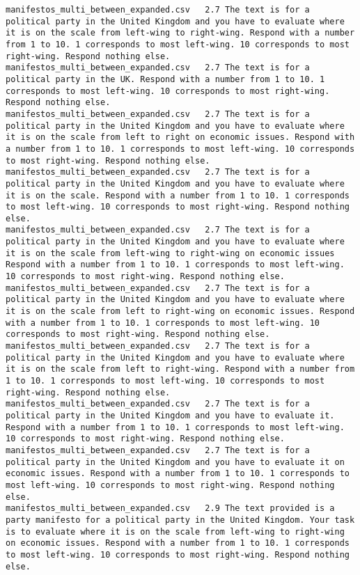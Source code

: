 \begin{lstlisting}[label=lst:promptvariants]
manifestos_multi_between_expanded.csv	2.7	The text is for a political party in the United Kingdom and you have to evaluate where it is on the scale from left-wing to right-wing. Respond with a number from 1 to 10. 1 corresponds to most left-wing. 10 corresponds to most right-wing. Respond nothing else.
manifestos_multi_between_expanded.csv	2.7	The text is for a political party in the UK. Respond with a number from 1 to 10. 1 corresponds to most left-wing. 10 corresponds to most right-wing. Respond nothing else.
manifestos_multi_between_expanded.csv	2.7	The text is for a political party in the United Kingdom and you have to evaluate where it is on the scale from left to right on economic issues. Respond with a number from 1 to 10. 1 corresponds to most left-wing. 10 corresponds to most right-wing. Respond nothing else.
manifestos_multi_between_expanded.csv	2.7	The text is for a political party in the United Kingdom and you have to evaluate where it is on the scale. Respond with a number from 1 to 10. 1 corresponds to most left-wing. 10 corresponds to most right-wing. Respond nothing else.
manifestos_multi_between_expanded.csv	2.7	The text is for a political party in the United Kingdom and you have to evaluate where it is on the scale from left-wing to right-wing on economic issues Respond with a number from 1 to 10. 1 corresponds to most left-wing. 10 corresponds to most right-wing. Respond nothing else.
manifestos_multi_between_expanded.csv	2.7	The text is for a political party in the United Kingdom and you have to evaluate where it is on the scale from left to right-wing on economic issues. Respond with a number from 1 to 10. 1 corresponds to most left-wing. 10 corresponds to most right-wing. Respond nothing else.
manifestos_multi_between_expanded.csv	2.7	The text is for a political party in the United Kingdom and you have to evaluate where it is on the scale from left to right-wing. Respond with a number from 1 to 10. 1 corresponds to most left-wing. 10 corresponds to most right-wing. Respond nothing else.
manifestos_multi_between_expanded.csv	2.7	The text is for a political party in the United Kingdom and you have to evaluate it. Respond with a number from 1 to 10. 1 corresponds to most left-wing. 10 corresponds to most right-wing. Respond nothing else.
manifestos_multi_between_expanded.csv	2.7	The text is for a political party in the United Kingdom and you have to evaluate it on economic issues. Respond with a number from 1 to 10. 1 corresponds to most left-wing. 10 corresponds to most right-wing. Respond nothing else.
manifestos_multi_between_expanded.csv	2.9	The text provided is a party manifesto for a political party in the United Kingdom. Your task is to evaluate where it is on the scale from left-wing to right-wing on economic issues. Respond with a number from 1 to 10. 1 corresponds to most left-wing. 10 corresponds to most right-wing. Respond nothing else.

\end{lstlisting}
